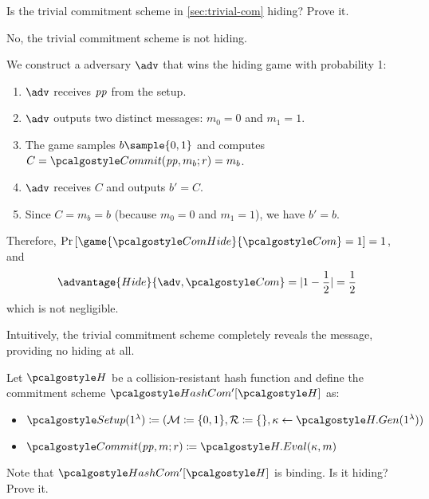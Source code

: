 \begin{exercise}
  Is the trivial commitment scheme in \cref{sec:trivial-com} hiding?
  Prove it.
\end{exercise}

\ifsolutions
\begin{mysolution}
  No, the trivial commitment scheme is not hiding.

  We construct a \ppt adversary $\adv$ that wins the hiding game with probability 1:

  \begin{enumerate}
    \item $\adv$ receives $\mathit{pp}$ from the setup.
    \item $\adv$ outputs two distinct messages: $m_0 = 0$ and $m_1 = 1$.
    \item The game samples $b \sample \{0, 1\}$ and computes $C = \algo{Commit}(\params, m_b; r) = m_b$.
    \item $\adv$ receives $C$ and outputs $b' = C$.
    \item Since $C = m_b = b$ (because $m_0 = 0$ and $m_1 = 1$), we have $b' = b$.
  \end{enumerate}

  Therefore, $\pr{\game{\algo{ComHide}}{\algo{Com}} = 1} = 1$, and 
  \[
    \advantage{Hide}{\adv, \algo{Com}} = |1 - \frac{1}{2}| = \frac{1}{2}
  \]
  which is not negligible.

  Intuitively, the trivial commitment scheme completely reveals the message, providing no hiding at all.
\end{mysolution}
\fi

\begin{exercise}
  Let $\algo{H}$ be a collision-resistant hash function and define the commitment scheme $\algo{HashCom'}[\algo{H}]$ as:
  \begin{itemize}
    \item $\algo{Setup}(1^\lambda) \defeq (\mathcal{M} \defeq \{0, 1\}, \mathcal{R} \defeq \{\}, \kappa \gets \algo{H.Gen}(1^\lambda))$
    \item $\algo{Commit}(\params,m;r) \defeq  \algo{H.Eval}(\kappa, m)$
  \end{itemize}
  Note that $\algo{HashCom'}[\algo{H}]$ is binding.
  Is it hiding?
  Prove it.
\end{exercise}

